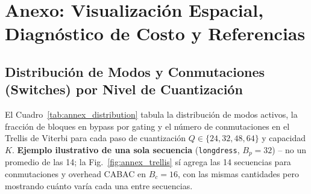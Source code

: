 \documentclass[11pt,a4paper]{article}
\begin{document}
\appendix
\section{Anexo: Visualización Espacial, Diagnóstico de Costo y Referencias}

\subsection{Distribución de Modos y Conmutaciones (Switches) por Nivel de Cuantización}
El Cuadro~\ref{tab:annex_distribution} tabula la distribución de modos activos, la fracción de bloques en bypass por gating y el número de conmutaciones en el Trellis de Viterbi para cada paso de cuantización $Q \in \{24, 32, 48, 64\}$ y capacidad $K$. \textbf{Ejemplo ilustrativo de una sola secuencia} (\texttt{longdress}, $B_p=32$) -- no un promedio de las 14; la Fig.~\ref{fig:annex_trellis} sí agrega las 14 secuencias para conmutaciones y overhead CABAC en $B_c=16$, con las mismas cantidades pero mostrando cuánto varía cada una entre secuencias.
\end{document}

